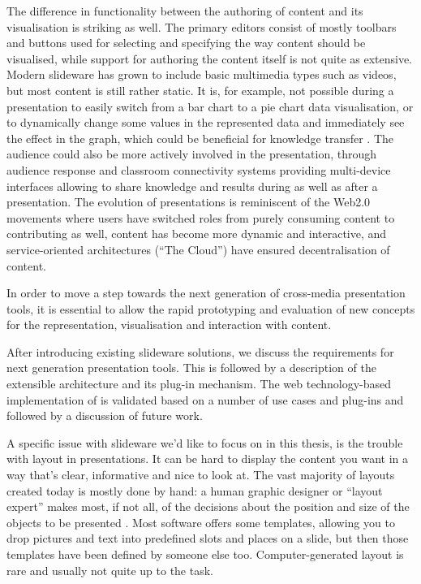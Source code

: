    The difference in functionality between the authoring of content and its
   visualisation is striking as well. The primary editors consist of mostly
   toolbars and buttons used for selecting and specifying the way content
   should be visualised, while support for authoring the content itself is not
   quite as extensive. Modern slideware has grown to include basic multimedia
   types such as videos, but most content is still rather static. It is, for
   example, not possible during a presentation to easily switch from a bar
   chart to a pie chart data visualisation, or to dynamically change some
   values in the represented data and immediately see the effect in the graph,
   which could be beneficial for knowledge transfer \citep{holzinger-1}. The
   audience could also be more actively involved in the presentation, through
   audience response and classroom connectivity systems providing multi-device
   interfaces allowing to share knowledge and results during as well as after a
   presentation. The evolution of presentations is reminiscent of the Web2.0
   movements where users have switched roles from purely consuming content to
   contributing as well, content has become more dynamic and interactive, and
   service-oriented architectures (``The Cloud'') have ensured decentralisation
   of content.

   In order to move a step towards the next generation of cross-media
   presentation tools, it is essential to allow the rapid prototyping and
   evaluation of new concepts for the representation, visualisation and
   interaction with content.
   
   After introducing existing slideware solutions, we discuss the requirements
   for next generation presentation tools. This is followed by a description of
   the extensible \mxp architecture and its plug-in mechanism. The web
   technology-based implementation of \mxp is validated based on a number of
   use cases and \mxp plug-ins and followed by a discussion of future work.

   A specific issue with slideware we'd like to focus on in this thesis, is the
   trouble with layout in presentations. It can be hard to display the content
   you want in a way that's clear, informative and nice to look at. The vast
   majority of layouts created today is mostly done by hand: a human graphic
   designer or ``layout expert'' makes most, if not all, of the decisions about
   the position and size of the objects to be presented \citep{lok-1}. Most
   software offers some templates, allowing you to drop pictures and text into
   predefined slots and places on a slide, but then those templates have been
   defined by someone else too. Computer-generated layout is rare and usually
   not quite up to the task.
  
